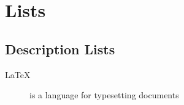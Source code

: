 \documentclass[latex-playground.tex]{subfiles}
\begin{document}
\chapter{Lists}
\section{Description Lists}

\begin{description}
  \item[\LaTeX] is a language for typesetting documents
\end{description}
\end{document}
